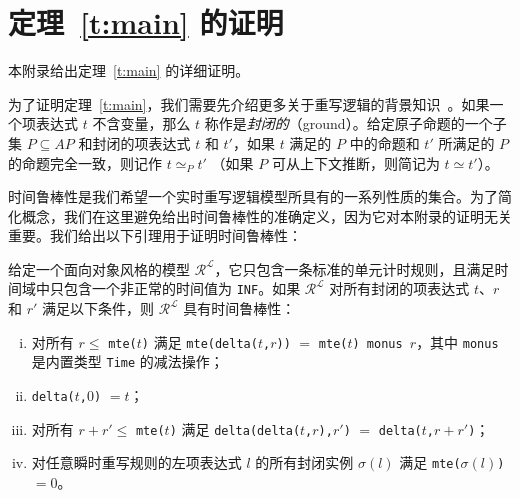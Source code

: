 \chapter{定理~\ref{t:main} 的证明}
\label{app:proof}

本附录给出定理~\ref{t:main} 的详细证明。

为了证明定理~\ref{t:main}，我们需要先介绍更多关于重写逻辑的背景知识~\cite{DBLP:journals/entcs/OlveczkyM07a}。如果一个项表达式 $t$ 不含变量，那么 $t$ 称作是\emph{封闭的}（ground）。给定原子命题的一个子集 $P\subseteq AP$ 和封闭的项表达式 $t$ 和 $t'$，如果 $t$ 满足的 $P$ 中的命题和 $t'$ 所满足的 $P$ 的命题完全一致，则记作 $t\simeq_P t'$ （如果 $P$ 可从上下文推断，则简记为 $t\simeq t'$）。

时间鲁棒性是我们希望一个实时重写逻辑模型所具有的一系列性质的集合。为了简化概念，我们在这里避免给出时间鲁棒性的准确定义，因为它对本附录的证明无关重要。我们给出以下引理用于证明时间鲁棒性：
\begin{lemma}
\label{l:timerobustness}
给定一个面向对象风格的模型 $\mathcal{R^L}$，它只包含一条标准的单元计时规则，且满足时间域中只包含一个非正常的时间值为 \verb|INF|。如果 $\mathcal{R^L}$ 对所有封闭的项表达式 $t$、$r$ 和 $r'$ 满足以下条件，则 $\mathcal{R^L}$ 具有时间鲁棒性：
\begin{enumerate}[(i)]
\item 
对所有 $r\le$ \verb|mte(|$t$\verb|)| 满足 \verb|mte(delta(|$t$\verb|,|$r$\verb|))| $=$ \verb|mte(|$t$\verb|) monus |$r$，其中 \verb|monus| 是内置类型 \verb|Time| 的减法操作；

\item
\verb|delta(|$t$\verb|,|$0$\verb|)| $= t$；

\item
对所有 $r+r'\le$ \verb|mte(|$t$\verb|)| 满足 \verb|delta(delta(|$t$\verb|,|$r$\verb|),|$r'$\verb|)| $=$ \verb|delta(|$t$\verb|,|$r+r'$\verb|)|；

\item
对任意瞬时重写规则的左项表达式 $l$ 的所有封闭实例 $\sigma(l)$ 满足 \verb|mte(|$\sigma(l)$\verb|)|$= 0$。
\end{enumerate}
\end{lemma}

